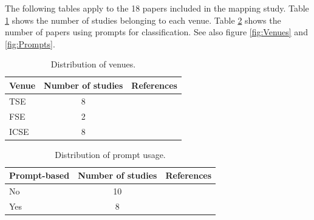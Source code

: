 \documentclass[a4paper]{article}
\begin{document}
\begin{appendices}
The following tables apply to the 18 papers included in the mapping study. Table \ref{refs:venues} shows the number of studies belonging to each venue. Table \ref{refs:prompts} shows the number of papers using prompts for classification.
See also figure \ref{fig:Venues} and \ref{fig:Prompts}.
\begin{table}[ht]
	\caption{Distribution of venues.}
	\begin{tabularx}{\textwidth}{|l|c|X|}
		\hline
		\textbf{Venue} & \textbf{Number of studies} & \textbf{References} \\ \hline
		TSE & 8 & \cite{10323231,10402095,10586831,10648982,10659742,10746847,10599336,10704582} \\ \hline
		FSE & 2 & \cite{10.1145/3663529.3663785,10.1145/3663529.3663794} \\ \hline
		ICSE & 8 & \cite{10.1145/3597503.3623345,10.1145/3597503.3623304,10.1145/3597503.3639217,10.1145/3597503.3639117,10.1145/3597503.3639194,10.1145/3597503.3639202,10.1145/3597503.3639216,10.1145/3597503.3623322} \\ \hline
	\end{tabularx}
	\label{refs:venues}
\end{table}

\begin{table}[ht]
	\caption{Distribution of prompt usage.}
	\begin{tabularx}{\textwidth}{|l|c|X|}
		\hline
		\textbf{Prompt-based} & \textbf{Number of studies} & \textbf{References} \\ \hline
		No & 10 & \cite{10.1145/3597503.3623345,10.1145/3597503.3623304,10.1145/3597503.3639217,10.1145/3597503.3639202,10323231,10402095,10586831,10.1145/3597503.3639216,10704582,10.1145/3597503.3623322} \\ \hline
		Yes & 8 & \cite{10.1145/3597503.3639117,10.1145/3597503.3639194,10.1145/3663529.3663785,10.1145/3663529.3663794,10648982,10659742,10746847,10599336} \\ \hline
	\end{tabularx}
	\label{refs:prompts}
\end{table}


\end{appendices}
\end{document}
